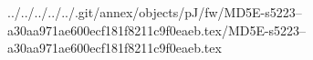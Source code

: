 ../../../../../.git/annex/objects/pJ/fw/MD5E-s5223--a30aa971ae600ecf181f8211c9f0eaeb.tex/MD5E-s5223--a30aa971ae600ecf181f8211c9f0eaeb.tex